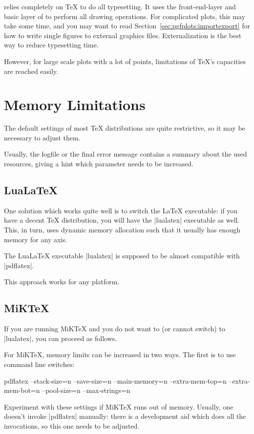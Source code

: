 {\PGFPlots{} relies completely on \TeX{} to do all typesetting. It uses the
front-end-layer and basic layer of \PGF{} to perform all drawing operations.
For complicated plots, this may take some time, and you may want to read
Section~\ref{sec:pgfplots:importexport} for how to write single figures to
external graphics files. Externalization is the best way to reduce typesetting
time.

However, for large scale plots with a lot of points, limitations of \TeX's
capacities are reached easily.


\section{Memory Limitations}

The default settings of most \TeX{} distributions are quite restrictive, so it
may be necessary to adjust them.

Usually, the logfile or the final error message contains a summary about the
used resources, giving a hint which parameter needs to be increased.


\subsection{Lua\LaTeX{}}

One solution which works quite well is to switch the \LaTeX{} executable: if
you have a decent \TeX{} distribution, you will have the |lualatex| executable
as well. This, in turn, uses dynamic memory allocation such that it usually has
enough memory for any \PGFPlots{} axis.

The Lua\LaTeX{} executable |lualatex| is supposed to be almost compatible with
|pdflatex|.

This approach works for any platform.


\subsection{MiK\TeX{}}

If you are running MiK\TeX{} and you do not want to (or cannot switch) to
|lualatex|, you can proceed as follows.

For MiK\TeX{}, memory limits can be increased in two ways. The first is to use
command line switches:
%
\begin{codeexample}
pdflatex
    --stack-size=n --save-size=n
    --main-memory=n --extra-mem-top=n --extra-mem-bot=n
    --pool-size=n --max-strings=n
\end{codeexample}
%
\noindent Experiment with these settings if MiK\TeX{} runs out of memory.
Usually, one doesn't invoke |pdflatex| manually: there is a development aid
which does all the invocations, so this one needs to be adjusted.

}
